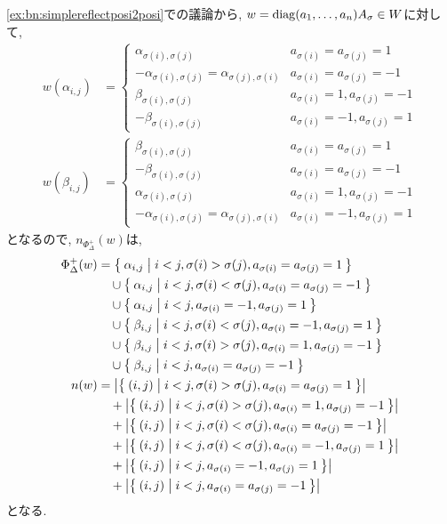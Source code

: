 \cref{ex:bn:simplereflectposi2posi}での議論から,
$w=\operatorname{diag}(a_1,\ldots,a_n)A_\sigma\in W$に対して,
\begin{align*}
  w(\alpha_{i,j})&=
  \begin{cases}
    \alpha_{\sigma(i),\sigma(j)}&a_{\sigma(i)}=a_{\sigma(j)}=1\\
    -\alpha_{\sigma(i),\sigma(j)}=\alpha_{\sigma(j),\sigma(i)}&a_{\sigma(i)}=a_{\sigma(j)}=-1\\
    \beta_{\sigma(i),\sigma(j)}&a_{\sigma(i)}=1,a_{\sigma(j)}=-1\\
    -\beta_{\sigma(i),\sigma(j)}&a_{\sigma(i)}=-1,a_{\sigma(j)}=1
  \end{cases}\\
  w(\beta_{i,j})&=
  \begin{cases}
    \beta_{\sigma(i),\sigma(j)}&a_{\sigma(i)}=a_{\sigma(j)}=1\\
    -\beta_{\sigma(i),\sigma(j)}&a_{\sigma(i)}=a_{\sigma(j)}=-1\\
    \alpha_{\sigma(i),\sigma(j)}&a_{\sigma(i)}=1,a_{\sigma(j)}=-1\\
    -\alpha_{\sigma(i),\sigma(j)}=\alpha_{\sigma(j),\sigma(i)}&a_{\sigma(i)}=-1,a_{\sigma(j)}=1
  \end{cases}
\end{align*}
となるので, $n_{\Phi_\Delta^+}(w)$は,
\begin{align*}
  \Phi_\Delta^+(w)
  &=
  \Set{\alpha_{i,j}|i<j,\sigma(i)>\sigma(j),a_{\sigma(i)}=a_{\sigma(j)}=1}\\
  &\quad \cup\Set{\alpha_{i,j}|i<j,\sigma(i)<\sigma(j),a_{\sigma(i)}=a_{\sigma(j)}=-1}\\
  &\quad \cup\Set{\alpha_{i,j}|i<j,a_{\sigma(i)}=-1,a_{\sigma(j)}=1}\\
  &\quad \cup\Set{\beta_{i,j}|i<j,\sigma(i)<\sigma(j),a_{\sigma(i)}=-1,a_{\sigma(j)}=1}\\
  &\quad \cup\Set{\beta_{i,j}|i<j,\sigma(i)>\sigma(j),a_{\sigma(i)}=1,a_{\sigma(j)}=-1}\\
  &\quad \cup\Set{\beta_{i,j}|i<j,a_{\sigma(i)}=a_{\sigma(j)}=-1}\\
  n(w)
  &=\left|\Set{(i,j)|i<j,\sigma(i)>\sigma(j),a_{\sigma(i)}=a_{\sigma(j)}=1}\right|\\
  &\quad +\left|\Set{(i,j)|i<j,\sigma(i)>\sigma(j),a_{\sigma(i)}=1,a_{\sigma(j)}=-1}\right|\\
  &\quad +\left|\Set{(i,j)|i<j,\sigma(i)<\sigma(j),a_{\sigma(i)}=a_{\sigma(j)}=-1}\right|\\
  &\quad +\left|\Set{(i,j)|i<j,\sigma(i)<\sigma(j),a_{\sigma(i)}=-1,a_{\sigma(j)}=1}\right|\\
  &\quad +\left|\Set{(i,j)|i<j,a_{\sigma(i)}=-1,a_{\sigma(j)}=1}\right|\\
  &\quad +\left|\Set{(i,j)|i<j,a_{\sigma(i)}=a_{\sigma(j)}=-1}\right|
\end{align*}
となる.


